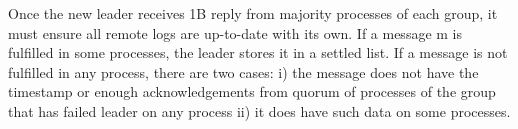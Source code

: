 Once the new leader receives 1B reply from majority processes of each group, it
must ensure all remote logs are up-to-date with its own. If a message m is
fulfilled in some processes, the leader stores it in a settled list. If a
message is not fulfilled in any process, there are two cases: i)  the message
does not have the timestamp or enough acknowledgements from quorum of processes
of the group that has failed leader on any process ii) it does have such data on
some processes.










